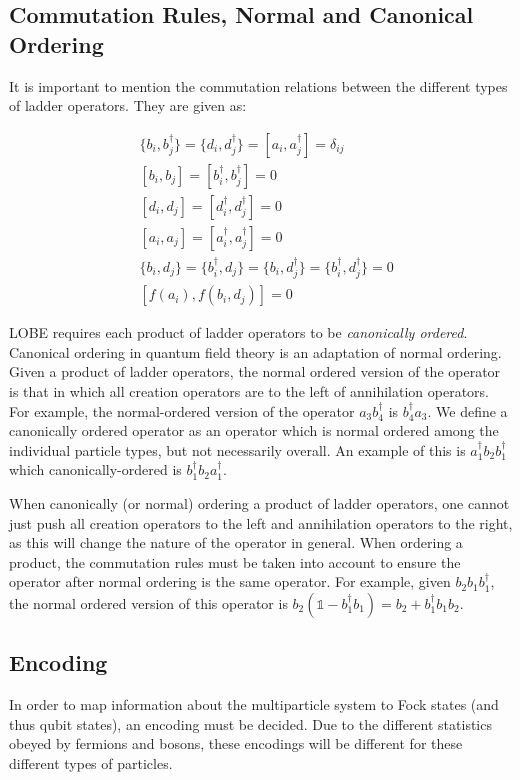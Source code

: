 \subsection{Commutation Rules, Normal and Canonical Ordering}
\label{subsec:commutation}
It is important to mention the commutation relations between the different types of ladder operators. They are given as:

\begin{align*}
    &\{b_i, b_j^\dagger\} = \{d_i, d_j^\dagger\} = [a_i, a_j^\dagger] = \delta_{ij}\\
    & [b_i, b_j] = [b_i^\dagger, b_j^\dagger] = 0 \\
    & [d_i, d_j] = [d_i^\dagger, d_j^\dagger] = 0 \\
    & [a_i, a_j] = [a_i^\dagger, a_j^\dagger] = 0 \\
    & \{b_i, d_j\} = \{b_i^\dagger, d_j\} = \{b_i, d_j^\dagger\} = \{b_i^\dagger, d_j^\dagger\} = 0\\
    & [f(a_i), f(b_i, d_j)] = 0
\end{align*}

LOBE requires each product of ladder operators to be \emph{canonically ordered}. Canonical ordering in quantum field theory is an adaptation of normal ordering. Given a product of ladder operators, the normal ordered version of the operator is that in which all creation operators are to the left of annihilation operators.
For example, the normal-ordered version of the operator $a_3 b_4^\dagger$ is $b_4^\dagger a_3$. We define a canonically ordered operator as an operator which is normal ordered among the individual particle types, but not necessarily overall. An example of this is $a_1^\dagger b_2 b_1^\dagger$ which canonically-ordered is $b_1^\dagger b_2 a_1^\dagger$.

When canonically (or normal) ordering a product of ladder operators, one cannot just push all creation operators to the left and annihilation operators to the right, as this will change the nature of the operator in general. When ordering a product, the commutation rules must be taken into account to ensure the operator after normal ordering is the same operator.
For example, given $b_2 b_1 b_1^\dagger$, the normal ordered version of this operator is $b_2 \left(\mathds{1} - b_1^\dagger b_1 \right) = b_2 + b_1^\dagger b_1 b_2$.

\subsection{Encoding}
\label{subsec:encoding}
In order to map information about the multiparticle system to Fock states (and thus qubit states), an encoding must be decided. Due to the different statistics obeyed by fermions and bosons, these encodings will be different for these different types of particles. 

